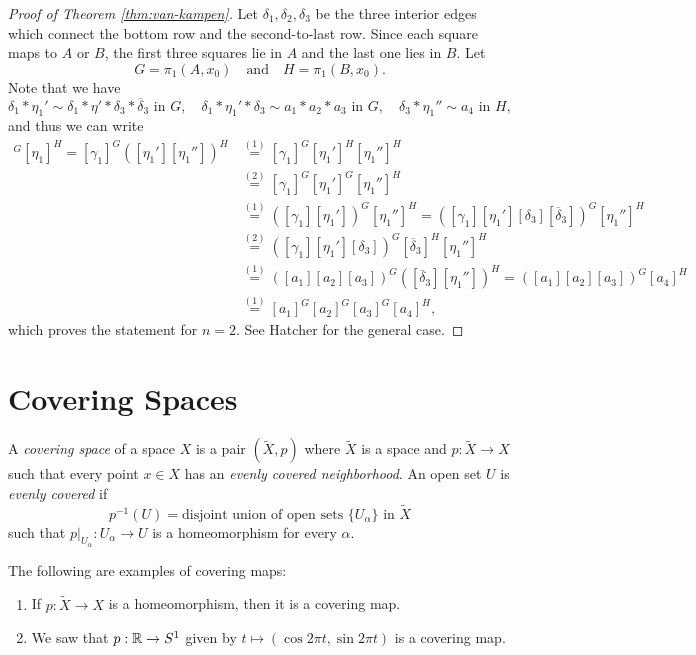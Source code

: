 \begin{proof}[Proof of Theorem \ref{thm:van-kampen}]
  Let $\delta_1, \delta_2, \delta_3$ be the three
  interior edges which connect the bottom row and the
  second-to-last row. Since each square maps to $A$ or
  $B$, the first three squares lie in $A$ and the last
  one lies in $B$. Let
  \[
    G = \pi_1(A, x_0) \quad \text{and} \quad H = \pi_1(B, x_0).
  \]
  Note that we have
  \[
    \delta_1 * \eta_1' \sim \delta_1 * \eta' * \delta_3 * \overline{\delta}_3 \text{ in $G$}, \quad
    \delta_1 * \eta_1' * \delta_3 \sim a_1 * a_2 * a_3 \text{ in $G$}, \quad 
   \delta_3 * \eta_1'' \sim a_4 \text{ in $H$},
  \]
  and thus we can write
  \begin{align*}
    [\gamma_1]^G [\eta_1]^H
    = [\gamma_1]^G ([\eta_1'] [\eta_1''])^{H}
    &\overset{(1)}{=} [\gamma_1]^G [\eta_1']^H [\eta_1'']^H  \\
    &\overset{(2)}{=} [\gamma_1]^G [\eta_1']^G [\eta_1'']^H \\
    &\overset{(1)}{=} ([\gamma_1] [\eta_1'])^G [\eta_1'']^H
    = ([\gamma_1] [\eta_1'] [\delta_3] [\overline{\delta}_3])^G [\eta_1'']^H \\
    &\overset{(2)}{=} ([\gamma_1] [\eta_1'] [\delta_3])^G [\overline{\delta}_3]^H [\eta_1'']^H \\
    &\overset{(1)}{=} ([a_1] [a_2] [a_3])^G ([\overline{\delta}_3] [\eta_1''])^H = ([a_1] [a_2][a_3])^G [a_4]^H \\
    &\overset{(1)}{=} [a_1]^G [a_2]^G [a_3]^G [a_4]^H,
  \end{align*}
  which proves the statement for $n = 2$. See
  Hatcher for the general case.
\end{proof}

\section{Covering Spaces}

\begin{definition}
  A \emph{covering space} of a space $X$ is a pair
  $(\widetilde{X}, p)$ where $\widetilde{X}$ is a
  space and $p : \widetilde{X} \to X$ such that
  every point $x \in X$ has an \emph{evenly covered neighborhood}.
  An open set $U$ is \emph{evenly covered} if
  \[
    p^{-1}(U) = \text{disjoint union of open sets $\{U_\alpha\}$ in $\widetilde{X}$}
  \]
  such that $p|_{U_\alpha} : U_\alpha \to U$ is a
  homeomorphism for every $\alpha$.
\end{definition}

\begin{example}
  The following are examples of covering maps:
  \begin{enumerate}
    \item If $p : \widetilde{X} \to X$ is a
      homeomorphism, then it is a covering map.
    \item We saw that $p : \mathbb{R} \to S^1$ given by
      $t \mapsto (\cos 2\pi t, \sin 2\pi t)$ is a
      covering map.
  \end{enumerate}
\end{example}

